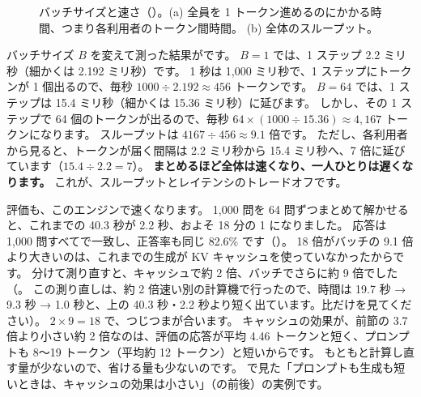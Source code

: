 \begin{figure}[tbp]
\centering
{}\hfill
{}
\caption{バッチサイズと速さ（）。(a) 全員を 1 トークン進めるのにかかる時間、つまり各利用者のトークン間時間。
(b) 全体のスループット。}
\label{fig:es-batch-size}
\end{figure}

バッチサイズ $B$ を変えて測った結果がです。
$B=1$ では、1 ステップ 2.2 ミリ秒（細かくは 2.192 ミリ秒）です。
1 秒は 1,000 ミリ秒で、1 ステップにトークンが 1 個出るので、毎秒 $1000\div2.192\approx456$ トークンです。
$B=64$ では、1 ステップは 15.4 ミリ秒（細かくは 15.36 ミリ秒）に延びます。
しかし、その 1 ステップで 64 個のトークンが出るので、毎秒 $64\times(1000\div15.36)\approx4{,}167$ トークンになります。
スループットは $4167\div456\approx9.1$ 倍です。
ただし、各利用者から見ると、トークンが届く間隔は 2.2 ミリ秒から 15.4 ミリ秒へ、7 倍に延びています（$15.4\div2.2=7$）。
\textbf{まとめるほど全体は速くなり、一人ひとりは遅くなります。}
これが、スループットとレイテンシのトレードオフです。

評価も、このエンジンで速くなります。
1,000 問を 64 問ずつまとめて解かせると、これまでの 40.3 秒が 2.2 秒、およそ 18 分の 1 になりました。
応答は 1,000 問すべてで一致し、正答率も同じ 82.6\% です（）。
18 倍がバッチの 9.1 倍より大きいのは、これまでの生成が KV キャッシュを使っていなかったからです。
分けて測り直すと、キャッシュで約 2 倍、バッチでさらに約 9 倍でした（。
この測り直しは、約 2 倍速い別の計算機で行ったので、時間は 19.7 秒 → 9.3 秒 → 1.0 秒と、上の 40.3 秒・2.2 秒より短く出ています。比だけを見てください）。
$2\times9=18$ で、つじつまが合います。
キャッシュの効果が、前節の 3.7 倍より小さい約 2 倍なのは、評価の応答が平均 4.46 トークンと短く、プロンプトも 8〜19 トークン（平均約 12 トークン）と短いからです。
もともと計算し直す量が少ないので、省ける量も少ないのです。
で見た「プロンプトも生成も短いときは、キャッシュの効果は小さい」（の前後）の実例です。

